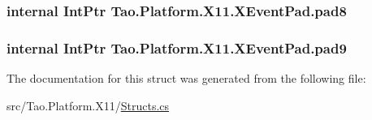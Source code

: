 \label{struct_tao_1_1_platform_1_1_x11_1_1_x_event_pad_afc601a303f83633f847cd2fdddabcf4b}
\hypertarget{struct_tao_1_1_platform_1_1_x11_1_1_x_event_pad_a4853f1a787127bac1c529011d3954da7}{
\subsubsection[{pad8}]{\setlength{\rightskip}{0pt plus 5cm}internal IntPtr {\bf Tao.Platform.X11.XEventPad.pad8}}}
\label{struct_tao_1_1_platform_1_1_x11_1_1_x_event_pad_a4853f1a787127bac1c529011d3954da7}
\hypertarget{struct_tao_1_1_platform_1_1_x11_1_1_x_event_pad_a2450e40e8aae7029a629b7ab017ebdb2}{
\subsubsection[{pad9}]{\setlength{\rightskip}{0pt plus 5cm}internal IntPtr {\bf Tao.Platform.X11.XEventPad.pad9}}}
\label{struct_tao_1_1_platform_1_1_x11_1_1_x_event_pad_a2450e40e8aae7029a629b7ab017ebdb2}


The documentation for this struct was generated from the following file:\begin{DoxyCompactItemize}
\item 
src/Tao.Platform.X11/\hyperlink{_structs_8cs}{Structs.cs}\end{DoxyCompactItemize}
